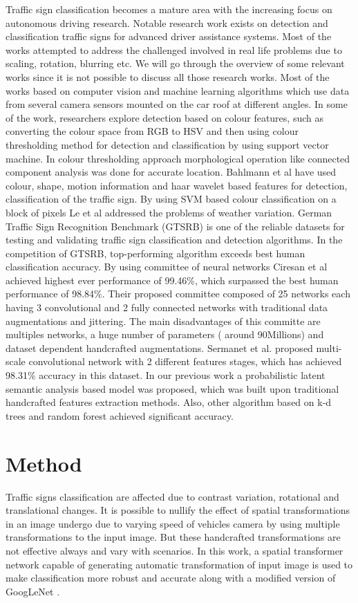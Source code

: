 \documentclass[conference]{IEEEtran}
\begin{document}
 
Traffic sign classification becomes a mature area with the increasing focus on autonomous driving research. Notable research work exists on detection and classification traffic signs for advanced driver assistance systems. Most of the works attempted to address the challenged involved in
real life problems due to scaling, rotation, blurring etc. We will go through the overview  of  some relevant works since it is not possible to discuss all those research works. Most  of  the  works based on computer vision and machine learning algorithms which use data from several camera sensors mounted on the car roof at different angles. In some of the work, researchers explore
detection based on colour features, such as converting the colour space from RGB to HSV and then using colour thresholding method for detection and classification by using support vector  machine. In colour thresholding approach morphological operation like connected component
analysis was done for accurate location. Bahlmann et al\cite{bah} have used colour, shape, motion information and haar wavelet based features for detection, classification of the traffic sign. By using SVM based colour classification on a block of pixels Le et al \cite{le} addressed the problems of weather variation. German Traffic Sign Recognition Benchmark (GTSRB) is one of the reliable datasets for testing and validating traffic sign classification and detection algorithms. In the competition of GTSRB, top-performing algorithm exceeds best human classification accuracy. By using committee of neural networks Ciresan et al \cite{committe} achieved highest ever
performance of 99.46\%, which surpassed the best human performance of 98.84\%. Their proposed committee composed of 25 networks each having 3 convolutional and 2 fully connected networks with traditional data augmentations and jittering. The main disadvantages of this committe are multiples networks, a huge number of parameters ( around 90Millions) and dataset dependent handcrafted augmentations. Sermanet et al. proposed multi-scale convolutional network \cite{multi} with 2 different features stages, which has achieved 98.31\% accuracy in this dataset. In our previous work \cite{plsa} a probabilistic latent semantic analysis based model was proposed, which was built upon traditional handcrafted features extraction methods. Also, other algorithm based on k-d trees and random forest \cite{rf} achieved significant accuracy.

\section{Method}
Traffic signs classification are affected due to contrast variation, rotational and translational changes. It is possible
to nullify the effect of spatial transformations in an image undergo due to varying speed of vehicles camera by using multiple
transformations to the input image. But these handcrafted transformations are not effective always and vary with scenarios.
In this work, a spatial transformer network \cite{stn} capable of generating automatic transformation of input image is used to
make classification more robust and accurate along with a modified version of GoogLeNet \cite{googlenet}.
\end{document}

